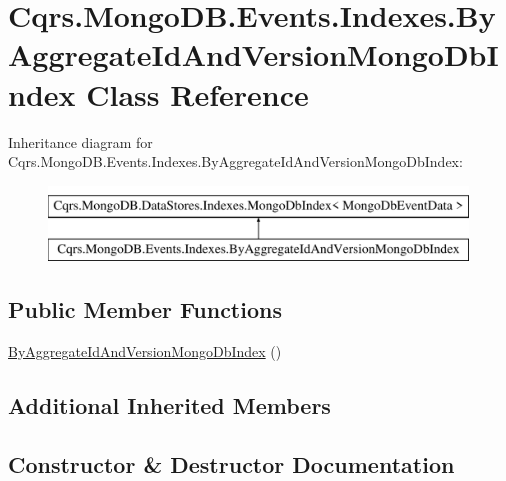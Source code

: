 \hypertarget{classCqrs_1_1MongoDB_1_1Events_1_1Indexes_1_1ByAggregateIdAndVersionMongoDbIndex}{}\section{Cqrs.\+Mongo\+D\+B.\+Events.\+Indexes.\+By\+Aggregate\+Id\+And\+Version\+Mongo\+Db\+Index Class Reference}
\label{classCqrs_1_1MongoDB_1_1Events_1_1Indexes_1_1ByAggregateIdAndVersionMongoDbIndex}
Inheritance diagram for Cqrs.\+Mongo\+D\+B.\+Events.\+Indexes.\+By\+Aggregate\+Id\+And\+Version\+Mongo\+Db\+Index\+:\begin{figure}[H]
\begin{center}
\leavevmode
\includegraphics[height=2.000000cm]{classCqrs_1_1MongoDB_1_1Events_1_1Indexes_1_1ByAggregateIdAndVersionMongoDbIndex}
\end{center}
\end{figure}
\subsection*{Public Member Functions}
\begin{DoxyCompactItemize}
\item 
\hyperlink{classCqrs_1_1MongoDB_1_1Events_1_1Indexes_1_1ByAggregateIdAndVersionMongoDbIndex_a084cc895e473e0e0ea2dbcf81bba4514_a084cc895e473e0e0ea2dbcf81bba4514}{By\+Aggregate\+Id\+And\+Version\+Mongo\+Db\+Index} ()
\end{DoxyCompactItemize}
\subsection*{Additional Inherited Members}


\subsection{Constructor \& Destructor Documentation}
\mbox{\label{classCqrs_1_1MongoDB_1_1Events_1_1Indexes_1_1ByAggregateIdAndVersionMongoDbIndex_a084cc895e473e0e0ea2dbcf81bba4514_a084cc895e473e0e0ea2dbcf81bba4514}} 
